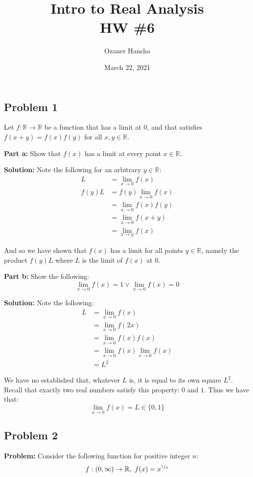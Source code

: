 \documentclass{article}
\newcommand{\R}{\mathbb R}
\begin{document}
\title{Intro to Real Analysis\\HW \#6}
\author{Ozaner Hansha}
\date{March 22, 2021}
\maketitle

\subsection*{Problem 1}
Let $f:\R\to\R$ be a function that has a limit at 0, and that satisfies $f(x+y)=f(x)f(y)$ for all $x,y\in\R$.
\bigskip

\noindent\textbf{Part a:} Show that $f(x)$ has a limit at every point $x\in\R$.
\bigskip

\noindent\textbf{Solution:} Note the following for an arbitrary $y\in\R$:
\begin{align*}
  L&=\lim_{x\to0}f(x)\tag{limit exists at 0}\\
  f(y)L&=f(y)\lim_{x\to0}f(x)\\
  &=\lim_{x\to0}f(x)f(y)\tag{product respects limit}\\
  &=\lim_{x\to0}f(x+y)\tag{def. of $f$}\\
  &=\lim_{x\to y}f(x)\tag{shift limit}
\end{align*}

And so we have shown that $f(x)$ has a limit for all points $y\in\R$, namely the product $f(y)L$ where $L$ is the limit of $f(x)$ at 0.
\bigskip

\noindent\textbf{Part b:} Show the following:
$$\lim_{x\to0}f(x)=1\vee\lim_{x\to0}f(x)=0$$

\noindent\textbf{Solution:} Note the following:
\begin{align*}
  L&=\lim_{x\to0}f(x)\tag{limit exists at 0}\\
  &=\lim_{x\to0}f(2x)\tag{$x\to0\implies 2x\to0$}\\
  &=\lim_{x\to0}f(x)f(x)\tag{def. of $f$}\\
  &=\lim_{x\to0}f(x)\lim_{x\to0}f(x)\tag{product of limits is limit of products}\\
  &=L^2\tag{limit exists at 0}
\end{align*}

We have no established that, whatever $L$ is, it is equal to its own square $L^2$. Recall that exactly two real numbers satisfy this property: $0$ and $1$. Thus we have that:
$$\lim_{x\to0}f(x)=L\in\{0,1\}$$

\subsection*{Problem 2}
\noindent\textbf{Problem:} Consider the following function for positive integer $n$:
$$f:(0,\infty)\to\R,\,\,f(x)=x^{\sfrac{1}{n}}$$
\end{document}
